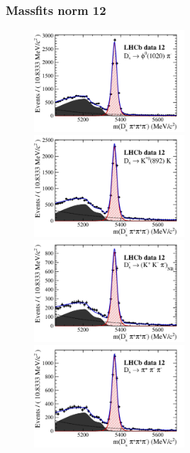 \documentclass[]{beamer}
\begin{document}
\begin{frame}
\frametitle{Massfits norm 12}

\begin{figure}
\includegraphics[height=!,width=0.5\textwidth]{plots/norm_y12_phipi.pdf}
\includegraphics[height=!,width=0.5\textwidth]{plots/norm_y12_KsK.pdf}\\
\includegraphics[height=!,width=0.5\textwidth]{plots/norm_y12_KKpi_NR.pdf}
\includegraphics[height=!,width=0.5\textwidth]{plots/norm_y12_pipipi.pdf}
\end{figure}

\end{frame}
\end{document}
